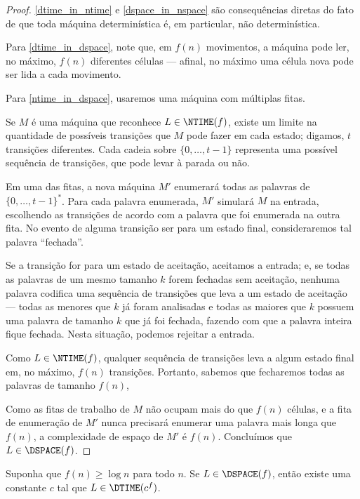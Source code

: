 \begin{proof}
    \ref{dtime_in_ntime} e \ref{dspace_in_nspace} são consequências diretas
    do fato de que toda máquina determinística é,
    em particular, não determinística.

    Para \ref{dtime_in_dspace},
    note que, em $f(n)$ movimentos,
    a máquina pode ler, no máximo,
    $f(n)$ diferentes células
    --- afinal, no máximo uma célula nova pode ser lida a cada movimento.

    Para \ref{ntime_in_dspace},
    usaremos uma máquina com múltiplas fitas.

    Se $M$ é uma máquina que reconhece $L \in \NTIME(f)$,
    existe um limite na quantidade de possíveis transições
    que $M$ pode fazer em cada estado;
    digamos, $t$ transições diferentes.
    Cada cadeia sobre $\{0, \dots, t-1\}$ representa uma possível
    sequência de transições,
    que pode levar à parada ou não.

    Em uma das fitas,
    a nova máquina $M'$
    enumerará todas as palavras de ${\{0, \dots, t-1\}}^*$.
    Para cada palavra enumerada,
    $M'$ simulará $M$ na entrada,
    escolhendo as transições de acordo com a palavra
    que foi enumerada na outra fita.
    No evento de alguma transição ser para um estado final,
    consideraremos tal palavra ``fechada''.

    Se a transição for para um estado de aceitação,
    aceitamos a entrada;
    e, se todas as palavras de um mesmo tamanho $k$
    forem fechadas sem aceitação,
    nenhuma palavra
    codifica uma sequência de transições
    que leva a um estado de aceitação
    --- todas as menores que $k$ já foram analisadas
    e todas as maiores que $k$
    possuem uma palavra de tamanho $k$ que já foi fechada,
    fazendo com que a palavra inteira fique fechada.
    Nesta situação, podemos rejeitar a entrada.

    Como $L \in \NTIME(f)$,
    qualquer sequência de transições leva a algum estado final
    em, no máximo, $f(n)$ transições.
    Portanto,
    sabemos que fecharemos todas as palavras
    de tamanho $f(n)$,

    Como as fitas de trabalho de $M$
    não ocupam mais do que $f(n)$ células,
    e a fita de enumeração de $M'$
    nunca precisará enumerar uma palavra mais longa que $f(n)$,
    a complexidade de espaço de $M'$ é $f(n)$.
    Concluímos que $L \in \DSPACE(f)$.
\end{proof}

\begin{theorem}
    Suponha que $f(n) \geq \log n$ para todo $n$.
    Se $L \in \DSPACE(f)$,
    então existe uma constante $c$
    tal que $L \in \DTIME(c^f)$.
\end{theorem}

